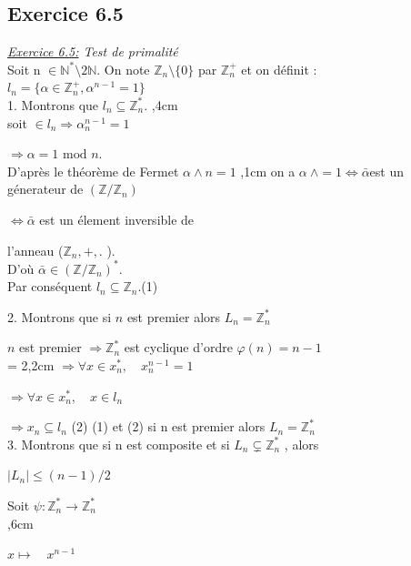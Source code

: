 \documentclass[10pt]{beamer}
\begin{document}
\begin{frame}
\section{Exercice 6.5}

\emph{\underline{Exercice 6.5:} Test de primalit\'{e}}
\\Soit  n  $\in   \mathbb{N}^{*}\setminus2 \mathbb{N}$. On note
$ \mathbb{Z}_n \setminus \{0\}$  par  $\mathbb{Z}_n^{+}$ et on d\'efinit :
\\$ l_n = \{ \alpha \in \mathbb{Z}_n^{+} , \alpha^{n-1} = 1\}$
\\1. Montrons que $l_n \subseteq  \mathbb{Z}_n^{*}.$
,4cm
\\soit $ \in l_n \Longrightarrow \alpha_n^{n-1} = 1$

$\Longrightarrow \alpha = 1 \mbox{ mod } n$.
\parindent=0cm
\\D'apr\`es le th\'eor\`eme de Fermet $\alpha \wedge n =1$
,1cm
on a $\alpha \: \wedge = 1 \Leftrightarrow \bar{\alpha}$est un g\'enerateur de
$(\mathbb{Z}/ \mathbb{Z}_n)$

$\Leftrightarrow \bar{\alpha}$ est un \'element inversible de
\parindent=3cm

l'anneau ($\mathbb{Z}_n,+,.$ ).
\\D'o\`u $ \bar{\alpha} \in (\mathbb{Z}/\mathbb{Z}_n)^*$.
\parindent=0cm
\\Par cons\'equent $l_n \subseteq \mathbb{Z}_n.  $\quad(1)

2. Montrons que si $n$ est premier alors $L_n = \mathbb{Z}_n^{*}$

$n$ est premier $\Longrightarrow \mathbb{Z}_n^{*}$ est cyclique d'ordre
$\varphi(n)= n-1$ 
\\ \parindent= 2,2cm
$ \Longrightarrow \forall x \in x_n^* , \quad x_n^{n-1} = 1$

$ \Longrightarrow \forall x \in x_n^* , \quad x \in l_n$

$ \Longrightarrow  x_n \subseteq l_n  $ \quad(2)
 (1) et (2) si n est premier alors $ L_n = \mathbb{Z}_n^*$
 \\ \parindent=0cm
3. Montrons que si n est composite et si $ L_n \subsetneq \mathbb{Z}_n^*$ , alors

$\vert L_n \vert \leq (n-1)/2$

Soit $\psi : \mathbb{Z}_n^* \longrightarrow\mathbb{Z}_n^* $
\\ ,6cm

$x\longmapsto \quad x^{n-1}$


\end{frame}
\end{document}
